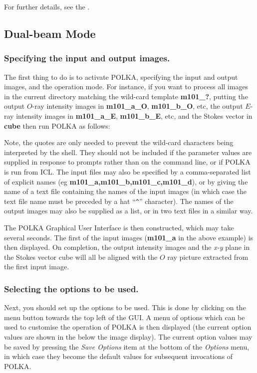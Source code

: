 \documentclass[11pt,nolof]{starlink}
\providecommand{\mylabel}[1] {\xlabel{#1}\label{#1}}
\begin{document}
For further details, see the .

\subsection {\mylabel{POLKA_DBEAM_TUT}Dual-beam Mode}

\subsubsection {Specifying the input and output images.}
The first thing to do is to activate POLKA, specifying the input and
output images, and the operation mode. For instance, if you
want to process all images in the current directory matching the wild-card
template \textbf{m101\_?}, putting the output $O$-ray intensity images
in \textbf{m101\_a\_O}, \textbf{m101\_b\_O}, etc, the output $E$-ray intensity
images in \textbf{m101\_a\_E}, \textbf{m101\_b\_E}, etc, and the Stokes vector
in \textbf{cube} then run POLKA as follows:

\begin{terminalv}
\end{terminalv}

Note, the quotes are only needed to prevent the wild-card characters
being interpreted by the shell. They should not be included if the
parameter values are supplied in response to prompts rather than on the
command line, or if POLKA is run from ICL. The input files may also be
specified by a comma-separated list of explicit names (eg \textbf{m101\_a,m101\_b,m101\_c,m101\_d}), or by giving the name of a text file
containing the names of the input images (in which case the text file
name must be preceded by a hat ``\verb+^+'' character). The names of the
output images may also be supplied as a list, or in two text files in a
similar way.

The POLKA Graphical User Interface is then constructed, which may take
several seconds. The first of the input images (\textbf{m101\_a} in the
above example) is then displayed. On completion, the output intensity
images and the \emph{x-y} plane in the Stokes vector cube will all be
aligned with the $O$ ray picture extracted from the first input image.

\subsubsection {Selecting the options to be used.}
Next, you should set up the options to be used. This is done by clicking
on the  menu button towards
the top left of the GUI. A menu of options which can be used to customise
the operation of POLKA is then displayed (the current option values are
shown in the  below the image
display). The current option values may be saved by pressing the \emph{Save Options} item at the bottom of the \emph{Options} menu, in which case
they become the default values for subsequent invocations of POLKA.
\end{document}
